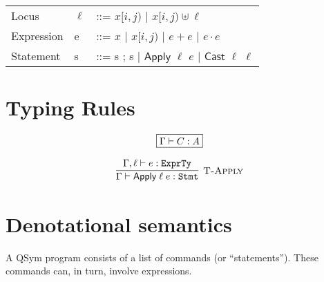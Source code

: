 \documentclass[runningheads]{llncs}
\newcommand {\ra} {\rightarrow}
\newcommand {\labinfer} [3] [] {\infer[{\textsc{#1}}]{#2}{#3}}
\newcommand {\State} {\textsf{State}}
\newcommand {\Value} {\textsf{Value}}
\newcommand {\Locus} {\textsf{Locus}}
\newcommand {\Loc} {\textsf{Location}}
\newcommand {\sem} [1] {\llbracket #1 \rrbracket}
\newcommand {\Esem} [1] {E\sem{#1}}
\newcommand {\Expr} {\textsf{Expr}}
\newcommand {\Cmd} {\textsf{Stmt}}
\newcommand {\CmdTy} {\texttt{Stmt}}
\newcommand {\ExprTy} {\texttt{ExprTy}}
\newcommand {\Apply} {\textsf{Apply}}
\newcommand {\Var} {\textsf{Var}}
\newcommand {\Index} {\textsf{Index}}
\newcommand {\Cast} {\textsf{Cast}}
\newcommand {\Permute} {\textsf{Permute}}
\newcommand {\loceq} {\approx}
\begin{document}
  \begin{tabular}{lll}
    Locus\; & $\ell$ & ::= $x[i, j)$ $\mid$ $x[i, j) \uplus \ell$\\
    Expression\; & e & ::= $x$ $\mid$ $x[i,j)$ $\mid$ $e + e$ $\mid$ $e \cdot e$\\
    Statement\; & s & ::= s ; s $\mid$ $\Apply$ $\ell$ $e$ $\mid$ $\Cast$ $\ell$ $\ell$
  \end{tabular}


\section{Typing Rules}

\[
  \begin{array}{c}
    \fbox{$\Gamma \vdash C : A$}
    \\\\
    \labinfer[T-Apply]{\Gamma \vdash \Apply\;\ell\;e : \CmdTy}
      {\Gamma, \ell \vdash e : \ExprTy}
  \end{array}
\]

\section{Denotational semantics}
A QSym program consists of a list of commands (or ``statements''). These commands can, in turn, involve expressions.


    \fbox{
      \begin{minipage}{\textwidth}
      \[
      \begin{array}{ll}
        \Esem{\cdot} &{}: \Expr \ra \Locus^{+} \ra \State \ra \State\\
                \sem{\cdot} &{}: \Cmd \ra (\State \ra \State)\\
                \Permute &{}: (\Locus \times \Locus) \ra (\Value \ra \Value)\\
                \State &{}= \Loc \ra \Value\\
                \Loc &{}= \Var \times \Index\\
                \ell \loceq \ell
          \end{array}
        \]
      \end{minipage}
}
\end{document}

